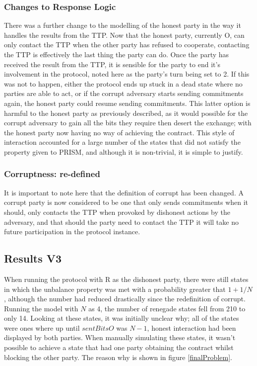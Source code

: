 \documentclass{l4proj}
\begin{document}
\subsubsection{Changes to Response Logic}

There was a further change to the modelling of the honest party in the way it handles the results from the TTP. Now that the honest party, currently O, can only contact the TTP when the other party has refused to cooperate, contacting the TTP is effectively the last thing the party can do. Once the party has received the result from the TTP, it is sensible for the party to end it's involvement in the protocol, noted here as the party's turn being set to 2. If this was not to happen, either the protocol ends up stuck in a dead state where no parties are able to act, or if the corrupt adversary starts sending commitments again, the honest party could resume sending commitments. This latter option is harmful to the honest party as previously described, as it would possible for the corrupt adversary to gain all the bits they require then desert the exchange; with the honest party now having no way of achieving the contract. This style of interaction accounted for a large number of the states that did not satisfy the property given to PRISM, and although it is non-trivial, it is simple to justify. 

\subsubsection{Corruptness: re-defined}
It is important to note here that the definition of corrupt has been changed. A corrupt party is now considered to be one that only sends commitments when it should, only contacts the TTP when provoked by dishonest actions by the adversary, and that should the party need to contact the TTP it will take no future participation in the protocol instance.


\subsection{Results V3}



When running the protocol with R as the dishonest party, there were still states in which the unbalance property was met with a probability greater that $1+1/N$, although the number had reduced drastically since the redefinition of corrupt. Running the model with $N$ as 4, the number of renegade states fell from 210 to only 14. Looking at these states, it was initially unclear why; all of the states were ones where up until $sentBitsO$ was $N-1$, honest interaction had been displayed by both parties. When manually simulating these states, it wasn't possible to achieve a state that had one party obtaining the contract whilst blocking the other party. The reason why is shown in figure \ref{finalProblem}.
\end{document}
